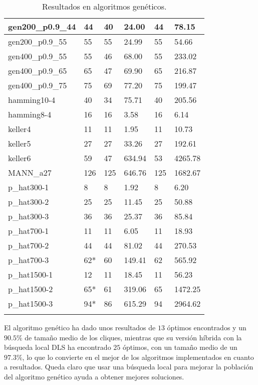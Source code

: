 \begin{small}
\begin{longtable}{l l l l l l}
    gen200\_p0.9\_44   & 44 & 40 & 24.00 & 44 & 78.15\\ \hline
    gen200\_p0.9\_55   & 55 & 55 & 24.99 & 55 & 54.66\\ \hline
    gen400\_p0.9\_55   & 55 & 46 & 68.00 & 55 & 233.02 \\ \hline
    gen400\_p0.9\_65   & 65 & 47 & 69.90 & 65 & 216.87\\ \hline
    gen400\_p0.9\_75   & 75 & 69 & 77.20 & 75 & 199.47\\ \hline
    hamming10-4        & 40 & 34 & 75.71 & 40 & 205.56\\ \hline
    hamming8-4         & 16 & 16 & 3.58 & 16 & 6.14\\ \hline
    keller4            & 11 & 11 & 1.95 & 11 & 10.73\\ \hline
    keller5            & 27 & 27 & 33.26 & 27 & 192.61\\ \hline
    keller6            & 59 & 47 & 634.94 & 53 & 4265.78\\ \hline
    MANN\_a27          & 126 & 125 & 646.76 & 125 & 1682.67\\ \hline
    p\_hat300-1        & 8 & 8 & 1.92 & 8 & 6.20\\ \hline
    p\_hat300-2        & 25 & 25 & 11.45 & 25 & 50.88\\ \hline
    p\_hat300-3        & 36 & 36 & 25.37 & 36 & 85.84\\ \hline
    p\_hat700-1        & 11 & 11 & 6.05 & 11 & 18.93\\ \hline
    p\_hat700-2        & 44 & 44 & 81.02 & 44 & 270.53\\ \hline
    p\_hat700-3        & 62* & 60 & 149.41 & 62 & 565.92\\ \hline
    p\_hat1500-1       & 12 & 11 & 18.45 & 11 & 56.23\\ \hline
    p\_hat1500-2       & 65* & 61 & 319.06 & 65 & 1472.25\\ \hline
    p\_hat1500-3       & 94* & 86 & 615.29 & 94 & 2964.62\\ \hline
  \caption{Resultados en algoritmos genéticos.}
\end{longtable}
\end{small}

El algoritmo genético ha dado unos resultados de $13$ óptimos encontrados y un
$90.5\%$ de tamaño medio de los cliques, mientras que su versión híbrida con la
búsqueda local DLS ha encontrado $25$ óptimos, con un tamaño medio de un $97.3\%$,
lo que lo convierte en el mejor de los algoritmos implementados en cuanto a resultados.
Queda claro que usar una búsqueda local para mejorar la población del algoritmo
genético ayuda a obtener mejores soluciones.

